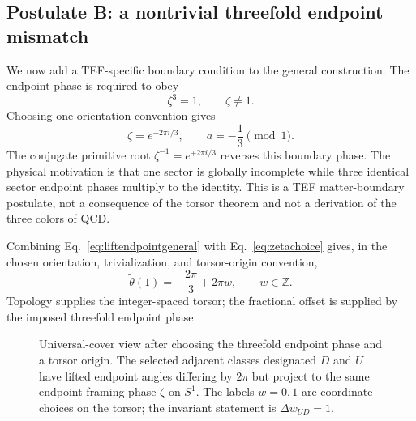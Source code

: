 \documentclass[aps,prd,reprint,superscriptaddress,nofootinbib,longbibliography,floatfix]{revtex4-2}
\begin{document}
\subsection{Postulate B: a nontrivial threefold endpoint mismatch}

We now add a TEF-specific boundary condition to the general construction. The endpoint phase is required to obey
\begin{equation}
\zeta^3=1,
\qquad
\zeta\neq1.
\label{eq:zetaBC}
\end{equation}
Choosing one orientation convention gives
\begin{equation}
\zeta=e^{-2\pi i/3},
\qquad
a=-\frac13\pmod1.
\label{eq:zetachoice}
\end{equation}
The conjugate primitive root $\zeta^{-1}=e^{+2\pi i/3}$ reverses this boundary phase. The physical motivation is that one sector is globally incomplete while three identical sector endpoint phases multiply to the identity. This is a TEF matter-boundary postulate, not a consequence of the torsor theorem and not a derivation of the three colors of QCD.

Combining Eq.~\eqref{eq:liftendpointgeneral} with Eq.~\eqref{eq:zetachoice} gives, in the chosen orientation, trivialization, and torsor-origin convention,
\begin{equation}
\widetilde\theta(1)
=-\frac{2\pi}{3}+2\pi w,
\qquad w\in\mathbb Z.
\label{eq:liftendpoint}
\end{equation}
Topology supplies the integer-spaced torsor; the fractional offset is supplied by the imposed threefold endpoint phase.

\begin{figure}[!ht]
\centering
{}
\caption{Universal-cover view after choosing the threefold endpoint phase and a torsor origin. The selected adjacent classes designated $D$ and $U$ have lifted endpoint angles differing by $2\pi$ but project to the same endpoint-framing phase $\zeta$ on $S^1$. The labels $w=0,1$ are coordinate choices on the torsor; the invariant statement is $\Delta w_{UD}=1$.}
\label{fig:relativeframing}
\end{figure}
\end{document}
